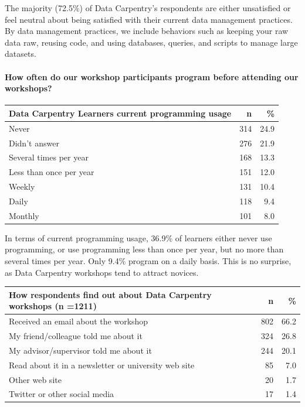 \documentclass[]{article}
\let\oldparagraph\paragraph
\renewcommand{\paragraph}[1]{\oldparagraph{#1}\mbox{}}
\begin{document}
The majority (72.5\%) of Data Carpentry's respondents are either
unsatisfied or feel neutral about being satisfied with their current
data management practices. By data management practices, we include
behaviors such as keeping your raw data raw, reusing code, and using
databases, queries, and scripts to manage large datasets.

\paragraph{How often do our workshop participants program before
attending our
workshops?}\label{how-often-do-our-workshop-participants-program-before-attending-our-workshops}

\begin{longtable}[]{@{}lrr@{}}
\toprule
Data Carpentry Learners current programming usage & n &
\%\tabularnewline
\midrule
\endhead
Never & 314 & 24.9\tabularnewline
Didn't answer & 276 & 21.9\tabularnewline
Several times per year & 168 & 13.3\tabularnewline
Less than once per year & 151 & 12.0\tabularnewline
Weekly & 131 & 10.4\tabularnewline
Daily & 118 & 9.4\tabularnewline
Monthly & 101 & 8.0\tabularnewline
\bottomrule
\end{longtable}

In terms of current programming usage, 36.9\% of learners either never
use programming, or use programming less than once per year, but no more
than several times per year. Only 9.4\% program on a daily basis. This
is no surprise, as Data Carpentry workshops tend to attract novices.

\begin{longtable}[]{@{}lrr@{}}
\toprule
How respondents find out about Data Carpentry workshops (n =1211) & n &
\%\tabularnewline
\midrule
\endhead
Received an email about the workshop & 802 & 66.2\tabularnewline
My friend/colleague told me about it & 324 & 26.8\tabularnewline
My advisor/supervisor told me about it & 244 & 20.1\tabularnewline
Read about it in a newsletter or university web site & 85 &
7.0\tabularnewline
Other web site & 20 & 1.7\tabularnewline
Twitter or other social media & 17 & 1.4\tabularnewline
\bottomrule
\end{longtable}
\end{document}

